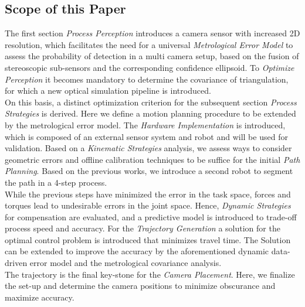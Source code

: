 \documentclass[5p,times,procedia]{elsarticle}
\begin{document}
\subsection{Scope of this Paper}
The first section \textit{Process Perception} introduces a camera sensor with increased 2D resolution, which facilitates the need for a universal \textit{Metrological Error Model} to assess the probability of detection in a multi camera setup, based on the fusion of stereoscopic sub-sensors and the corresponding confidence ellipsoid. To \textit{Optimize Perception} it becomes mandatory to determine the covariance of triangulation, for which a new optical simulation pipeline is introduced.\\
On this basis, a distinct optimization criterion for the subsequent section \textit{Process Strategies} is derived. Here we define a motion planning procedure to be extended by the metrological error model. The \textit{Hardware Implementation}  is introduced, which is composed of an external sensor system and robot and will be used for validation. Based on a \textit{Kinematic Strategies} analysis, we assess ways to consider geometric errors and offline calibration techniques to be suffice for the initial \textit{Path Planning}. Based on the previous works, we introduce a second robot to segment the path in a 4-step process.\\
While the previous steps have minimized the error in the task space, forces and torques lead to undesirable errors in the joint space.
Hence, \textit{Dynamic Strategies} for compensation are evaluated, and a predictive model is introduced to trade-off process speed and accuracy. For the \textit{Trajectory Generation} a solution for the optimal control problem is introduced that minimizes travel time. The Solution can be extended to improve the accuracy by the aforementioned dynamic data-driven error model and the metrological covariance analysis.\\
The trajectory is the final key-stone for the \textit{Camera Placement}. Here, we finalize the set-up and determine the camera positions to minimize obscurance and maximize accuracy.
%
\end{document}
